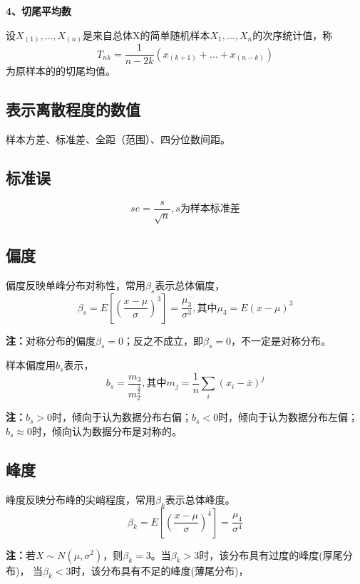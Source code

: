 \documentclass[lang=cn,10pt]{elegantbook}
\begin{document}
\textbf{4、切尾平均数}

设$X_{(1)},...,X_{(n)}\text{是来自总体X的简单随机样本}X_{1},...,X_{n}$的次序统计值，称
\begin{equation}
    T_{nk}=\frac{1}{n-2k}(x_{(k+1)}+\ldots+x_{(n-k)})
\end{equation}
为原样本的的切尾均值。

\subsection{表示离散程度的数值}
样本方差、标准差、全距（范围）、四分位数间距。

\subsection{标准误}
\begin{equation}
    se = \frac{s}{\sqrt{n}},s\text{为样本标准差}
\end{equation}

\subsection{偏度}
偏度反映单峰分布对称性，常用$\beta_s$表示总体偏度，
\begin{equation}
    \beta_s=E[(\frac{x-\mu}\sigma)^3]=\frac{\mu_3}{\sigma^3},\text{其中}\mu_3=E(x-\mu)^3
\end{equation}

\textbf{注：}对称分布的偏度$\beta_s=0$；反之不成立，即$\beta_s=0$，不一定是对称分布。

样本偏度用$b_s$表示，
\begin{equation}
    b_s=\frac{m_3}{m_2^{\frac{3}{2}}},\text{其中}m_j=\frac{1}{n}\sum_i(x_i-\overline{x})^j
\end{equation}

\textbf{注：}$b_s>0$时，倾向于认为数据分布右偏；$b_s<0$时，倾向于认为数据分布左偏；
$b_s\approx 0$时，倾向认为数据分布是对称的。

\subsection{峰度}
峰度反映分布峰的尖峭程度，常用$\beta_k$表示总体峰度。
\begin{equation}
    \beta_k=E[(\frac{x-\mu}{\sigma})^4]=\frac{\mu_4}{\sigma^4}
\end{equation}

\textbf{注：}若$X\sim N(\mu,\sigma^2)$，则$\beta_k=3$。当$\beta_k>3$时，该分布具有过度的峰度(厚尾分布)，
当$\beta_k<3$时，该分布具有不足的峰度(薄尾分布)，
\end{document}
